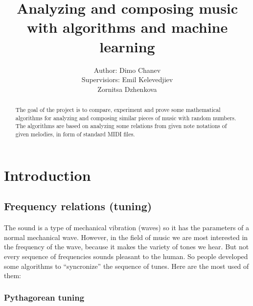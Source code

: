 \documentclass[]{article}
\title{Analyzing and composing music with algorithms and machine learning}
\author{
    \begin{tabular}{rl}
        \normalsize{Author: } & \normalsize{Dimo Chanev} \\
        \scriptsize{Supervisiors: } & \scriptsize{Emil Kelevedjiev}\\
                                    & \scriptsize{Zornitsa Dzhenkova}
    \end{tabular}
}
\begin{document}
    \maketitle
    \newpage

    \tableofcontents

    \newpage
    \begin{abstract}
        The goal of the project is to compare, experiment and prove some mathematical algorithms for analyzing and composing similar pieces of music with random numbers. The algorithms are based on analyzing some relations from given note notations of given melodies, in form of standard MIDI files.
    \end{abstract}

    \newpage

    \section{Introduction}
        \subsection {Frequency relations (tuning)}
        \paragraph{} The sound is a type of mechanical vibration (waves) so it has the parameters of a normal mechanical wave. However, in the field of music we are most interested in the frequency of the wave, because it makes the variety of tones we hear. But not every sequence of frequencies sounds pleasant to the human. So people developed some algorithms to ``syncronize'' the sequence of tunes. Here are the most used of them:

            \subsubsection {Pythagorean tuning} 
\end{document}
